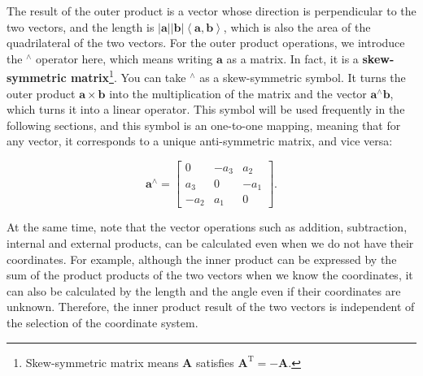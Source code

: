 The result of the outer product is a vector whose direction is perpendicular to the two vectors, and the length is $ \left | \mathbf{a} \right | \left | \mathbf{b} \right | \left \langle { \mathbf {a}, \mathbf {b}} \right \rangle  $, which is also the area of the quadrilateral of the two vectors. For the outer product operations, we introduce the $ ^ \wedge $ operator here, which means writing $ \mathbf{a} $ as a matrix. In fact, it is a \textbf {skew-symmetric matrix}\footnote{Skew-symmetric matrix means $ \mathbf{A} $ satisfies $ \mathbf{A}^ \mathrm{T}=- \mathbf{A}$. }. You can take $ ^ \wedge $ as a skew-symmetric symbol. It turns the outer product $ \mathbf{a} \times  \mathbf{b} $ into the multiplication of the matrix and the vector $ { \mathbf{a}^ \wedge } \mathbf{b} $, which turns it into a linear operator. This symbol will be used frequently in the following sections, and this symbol is an one-to-one mapping, meaning that for any vector, it corresponds to a unique anti-symmetric matrix, and vice versa:

\begin{equation}
\mathbf{a}^\wedge = \left[ {\begin{array}{*{20}{c}}
	0&{-{a_3}}&{{a_2}}\\  
	{{a_3}}&0&{ - {a_1}}\\
	{ - {a_2}}&{{a_1}}&0
	\end{array}} \right].
\end{equation}

At the same time, note that the vector operations such as addition, subtraction, internal and external products, can be calculated even when we do not have their coordinates. For example, although the inner product can be expressed by the sum of the product products of the two vectors when we know the coordinates, it can also be calculated by the length and the angle even if their coordinates are unknown. Therefore, the inner product result of the two vectors is independent of the selection of the coordinate system.


